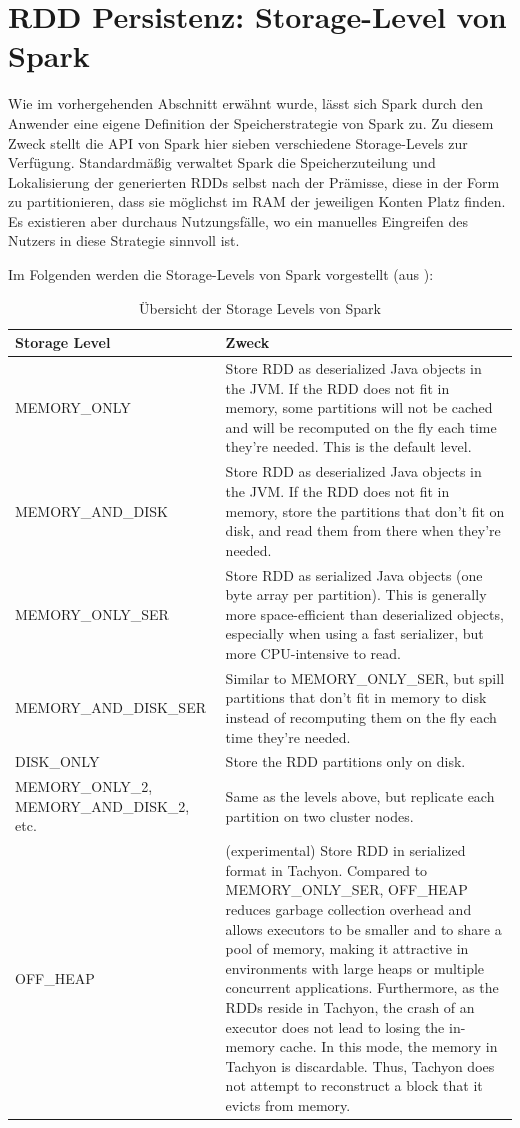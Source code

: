 \section{RDD Persistenz: Storage-Level von Spark}
\label{section:storage lvl}

Wie im vorhergehenden Abschnitt erwähnt wurde, lässt sich Spark durch den Anwender eine eigene Definition der Speicherstrategie von Spark zu. Zu diesem Zweck stellt die API von Spark hier sieben verschiedene Storage-Levels  zur Verfügung. Standardmäßig verwaltet Spark die Speicherzuteilung und Lokalisierung der generierten RDDs selbst nach der Prämisse,  diese in der Form zu partitionieren, dass sie möglichst im RAM der jeweiligen Konten Platz finden. Es existieren aber durchaus Nutzungsfälle, wo ein manuelles Eingreifen des Nutzers in diese Strategie sinnvoll ist. 

Im Folgenden werden die Storage-Levels von Spark vorgestellt (aus ): 

\begin{table}[!ht]
\centering
\begin{tabular}{| p{5cm} | p{8cm} | }
\hline
Storage Level & Zweck \\ \hline \hline
MEMORY\_ONLY & Store RDD as deserialized Java objects in the JVM. If the RDD does not fit in memory, some partitions will not be cached and will be recomputed on the fly each time they're needed. This is the default level. \\ \hline 
MEMORY\_AND\_DISK & Store RDD as deserialized Java objects in the JVM. If the RDD does not fit in memory, store the partitions that don't fit on disk, and read them from there when they're needed. \\ \hline 
MEMORY\_ONLY\_SER & Store RDD as serialized Java objects (one byte array per partition). This is generally more space-efficient than deserialized objects, especially when using a fast serializer, but more CPU-intensive to read. \\ \hline 
MEMORY\_AND\_DISK\_SER & Similar to MEMORY\_ONLY\_SER, but spill partitions that don't fit in memory to disk instead of recomputing them on the fly each time they're needed. \\ \hline 
DISK\_ONLY & Store the RDD partitions only on disk. \\ \hline 
MEMORY\_ONLY\_2, MEMORY\_AND\_DISK\_2, etc. & Same as the levels above, but replicate each partition on two cluster nodes. \\ \hline 
OFF\_HEAP & (experimental)	Store RDD in serialized format in Tachyon. Compared to MEMORY\_ONLY\_SER, OFF\_HEAP reduces garbage collection overhead and allows executors to be smaller and to share a pool of memory, making it attractive in environments with large heaps or multiple concurrent applications. Furthermore, as the RDDs reside in Tachyon, the crash of an executor does not lead to losing the in-memory cache. In this mode, the memory in Tachyon is discardable. Thus, Tachyon does not attempt to reconstruct a block that it evicts from memory.  \\ \hline 
\end{tabular}
\caption{Übersicht der Storage Levels von Spark}
	\label{tab:storagelevels}
\end{table}

